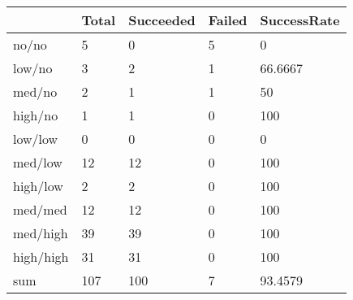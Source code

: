 \begin{tabular}{lllll}
& Total & Succeeded & Failed & SuccessRate \\ 
\hline 
no/no & 5 & 0 & 5 & 0 \\ 
low/no & 3 & 2 & 1 & 66.6667 \\ 
med/no & 2 & 1 & 1 & 50 \\ 
high/no & 1 & 1 & 0 & 100 \\ 
low/low & 0 & 0 & 0 & 0 \\ 
med/low & 12 & 12 & 0 & 100 \\ 
high/low & 2 & 2 & 0 & 100 \\ 
med/med & 12 & 12 & 0 & 100 \\ 
med/high & 39 & 39 & 0 & 100 \\ 
high/high & 31 & 31 & 0 & 100 \\ 
sum & 107 & 100 & 7 & 93.4579 \\ 
\hline 
\end{tabular}